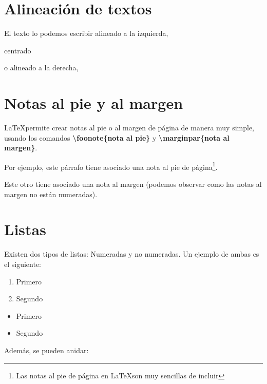 \documentclass[12pt]{book} %
\begin{document}
\section{Alineación de textos}

\begin{flushleft}
El texto lo podemos escribir alineado a la izquierda,	
\end{flushleft}

\begin{center}
centrado
\end{center}

\begin{flushright}
o alineado a la derecha,	
\end{flushright}

\section{Notas al pie y al margen}

\LaTeX permite crear notas al pie o al margen de página de manera muy simple, usando los comandos \textbf{\textbackslash foonote\{nota al pie\}} y \textbf{\textbackslash marginpar\{nota al margen\}}.

Por ejemplo, este párrafo tiene asociado una nota al pie de página\footnote{Las notas al pie de página en \LaTeX son muy sencillas de incluir}.

Este otro tiene asociado una nota al margen (podemos observar como las notas al margen no están numeradas).

\section{Listas}

Existen dos tipos de listas: Numeradas y no numeradas. Un ejemplo de ambas es el siguiente:

\begin{enumerate}
\item Primero
\item Segundo
\end{enumerate}

\begin{itemize}
\item Primero
\item Segundo
\end{itemize}

Además, se pueden anidar:
\end{document}
